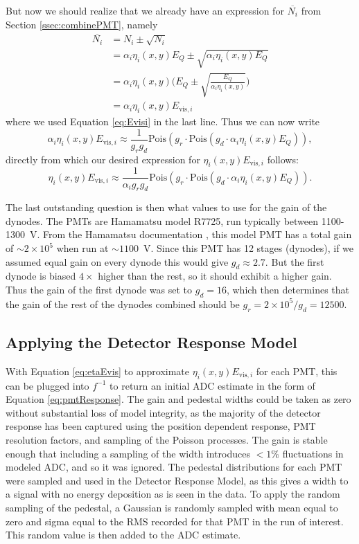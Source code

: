 But now we should realize that we already have an expression for $\overline{N_i}$ from Section \ref{ssec:combinePMT}, namely
\begin{align}
  \overline{N_i} &= N_i \pm \sqrt{N_i} \\
  &= \alpha_i \eta_i(x,y) E_Q \pm \sqrt{\alpha_i \eta_i(x,y) E_Q} \\
  &= \alpha_i \eta_i(x,y) \Bigg( E_Q \pm \sqrt{\frac{E_Q}{\alpha_i \eta_i(x,y)}}\Bigg) \\
  &= \alpha_i \eta_i(x,y) E_{\mathrm{vis},i} 
  \label{eq:bam}
\end{align}
where we used Equation \ref{eq:Evisi} in the last line. Thus we can now write
\begin{equation}
   \alpha_i \eta_i(x,y) E_{\mathrm{vis},i} \approx \frac{1}{g_rg_d}\mathrm{Pois}(g_r \cdot \mathrm{Pois}(g_d \cdot \alpha_i \eta_i(x,y) E_Q)),
  \label{eq:ntot4}
\end{equation}
directly from which our desired expression for $\eta_i(x,y) E_{\mathrm{vis},i}$ follows:
\begin{equation}
   \eta_i(x,y) E_{\mathrm{vis},i} \approx \frac{1}{\alpha_i g_rg_d}\mathrm{Pois}(g_r \cdot \mathrm{Pois}(g_d \cdot \alpha_i \eta_i(x,y) E_Q)).
  \label{eq:etaEvis}
\end{equation}

The last outstanding question is then what values to use for the gain of the dynodes. The PMTs are
Hamamatsu model R7725, run typically between 1100-1300~V. From the Hamamatsu documentation \cite{hamamatsu},
this model PMT has a total gain of $\sim2\times 10^5$ when run at $\sim1100$~V. Since this PMT has 12 stages (dynodes),
if we assumed equal gain on every dynode this would give $g_d\approx2.7$. But the first dynode is biased $4\times$ higher
than the rest, so it should exhibit a higher gain. Thus the gain of the first dynode was set to $g_d=16$, which then determines
that the gain of the rest of the dynodes combined should be $g_r = 2\times 10^5/g_d = 12500$.

\subsection{Applying the Detector Response Model}

With Equation \ref{eq:etaEvis} to approximate $\eta_i(x,y) E_{\mathrm{vis},i}$ for each PMT, this can be plugged into
$f^{-1}$ to return an initial ADC estimate in the form of Equation \ref{eq:pmtResponse}. The gain and pedestal
widths could be taken as zero without substantial loss of model integrity, as the majority of the detector
response has been captured using the position dependent response, PMT resolution factors, and sampling of the
Poisson processes. The gain is stable enough that including a sampling of the width introduces $<1\%$ fluctuations
in modeled ADC, and so it was ignored. The pedestal distributions for each PMT were sampled and used in the
Detector Response Model, as this gives a width to a signal with no energy deposition as is seen in the data.
To apply the random sampling of the pedestal, a Gaussian is randomly sampled with mean equal to zero and sigma equal
to the RMS recorded for that PMT in the run of interest. This random value is then added to the ADC estimate. 

